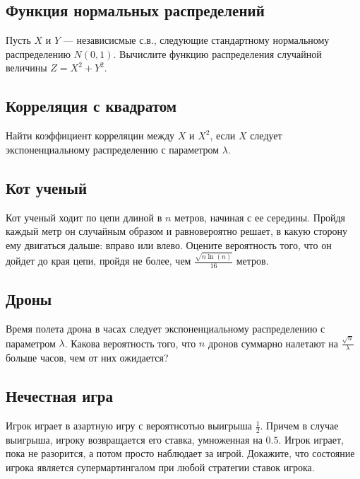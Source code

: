\documentclass[12pt]{article}
\begin{document}
\subsection{Функция нормальных распределений}

Пусть $X$ и $Y$ --- независисмые с.в., следующие стандартному нормальному распределению $N(0, 1)$. Вычислите функцию распределения случайной величины $Z = X^2 + Y^2$.



\subsection{Корреляция с квадратом}

Найти коэффициент корреляции между $X$ и $X^2$, если $X$ следует экспоненциальному распределению с параметром $\lambda$.



\subsection{Кот ученый}

Кот ученый ходит по цепи длиной в $n$ метров, начиная с ее середины. Пройдя каждый метр он случайным образом и равновероятно решает, в какую сторону ему двигаться дальше: вправо или влево. Оцените вероятность того, что он дойдет до края цепи, пройдя не более, чем $\frac{\sqrt{n \ln(n)}}{16}$ метров.



\subsection{Дроны}

Время полета дрона в часах следует экспоненциальному распределению с параметром $\lambda$. Какова вероятность того, что $n$ дронов суммарно налетают на $\frac{\sqrt{n}}{\lambda}$ больше часов, чем от них ожидается?



\subsection{Нечестная игра}

Игрок играет в азартную игру с вероятнсотью выигрыша $\frac{1}{2}$. Причем в случае выигрыша, игроку возвращается его ставка, умноженная на $0.5$. Игрок играет, пока не разорится, а потом просто наблюдает за игрой. Докажите, что состояние игрока является супермартингалом при любой стратегии ставок игрока.
\end{document}
